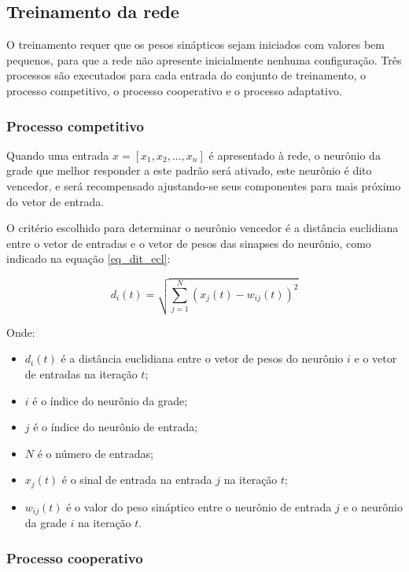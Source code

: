\subsection{Treinamento da rede}

O treinamento requer que os pesos sinápticos sejam iniciados com valores bem
pequenos, para que a rede não apresente inicialmente nenhuma configuração. Três
processos são executados para cada entrada do conjunto de treinamento, o
processo competitivo, o processo cooperativo e o processo adaptativo.

\subsubsection{Processo competitivo}

Quando uma entrada $ x = \left[x_1, x_2, ..., x_n\right] $ é apresentado à
rede, o neurônio da grade que melhor responder a este padrão será ativado, este
neurônio é dito vencedor, e será recompensado ajustando-se seus componentes
para mais próximo do vetor de entrada.

O critério escolhido para determinar o neurônio vencedor é a distância
euclidiana entre o vetor de entradas e o vetor de pesos das sinapses do
neurônio, como indicado na equação \ref{eq_dit_ecl}:

\begin{equation}\label{eq_dit_ecl}
d_i(t) = \sqrt{\sum_{j = 1}^N \left( x_j(t) - w_{ij}(t) \right)^2}
\end{equation}

Onde:

\begin{itemize}
\item $ d_i(t) $ é a distância euclidiana entre o vetor de pesos do
neurônio $ i $ e o vetor de entradas na iteração $ t $;
\item $ i $ é o índice do neurônio da grade;
\item $ j $ é o índice do neurônio de entrada;
\item $ N $ é o número de entradas;
\item $ x_j(t) $ é o sinal de entrada na entrada $ j $ na iteração $ t $;
\item $ w_{ij}(t) $ é o valor do peso sináptico entre o neurônio de
entrada $ j $ e o neurônio da grade $ i $ na iteração $ t $.
\end{itemize}

\subsubsection{Processo cooperativo}

